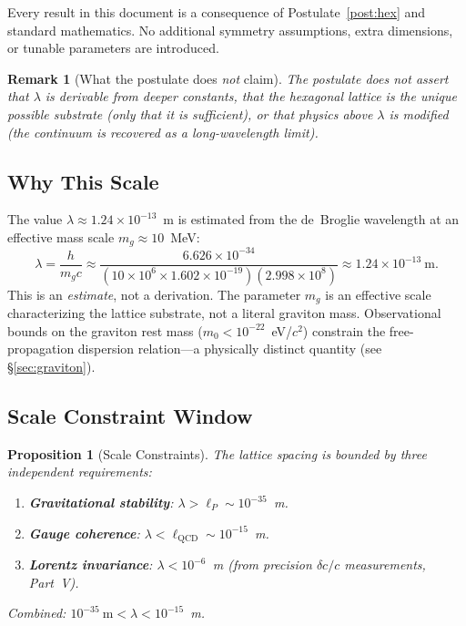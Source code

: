\documentclass[11pt,letterpaper]{article}
\newtheorem{proposition}[theorem]{Proposition}
\newtheorem{remark}[theorem]{Remark}
\begin{document}
Every result in this document is a consequence of Postulate~\ref{post:hex}
and standard mathematics.  No additional symmetry assumptions, extra
dimensions, or tunable parameters are introduced.

\begin{remark}[What the postulate does \emph{not} claim]
The postulate does not assert that $\lambda$ is derivable from deeper
constants, that the hexagonal lattice is the unique possible substrate
(only that it is sufficient), or that physics above $\lambda$ is
modified (the continuum is recovered as a long-wavelength limit).
\end{remark}

\subsection{Why This Scale}

The value $\lambda \approx 1.24 \times 10^{-13}$~m is estimated from the
de~Broglie wavelength at an effective mass scale $m_g \approx 10$~MeV:
\begin{equation}\label{eq:lambda}
  \lambda = \frac{h}{m_g c}
  \approx \frac{6.626\times10^{-34}}
               {(10\times10^6\times1.602\times10^{-19})(2.998\times10^8)}
  \approx 1.24\times10^{-13}~\text{m}.
\end{equation}
This is an \emph{estimate}, not a derivation.  The parameter $m_g$ is
an effective scale characterizing the lattice substrate, not a literal
graviton mass.  Observational bounds on the graviton rest mass
($m_0 < 10^{-22}$~eV/$c^2$) constrain the free-propagation dispersion
relation---a physically distinct quantity (see \S\ref{sec:graviton}).

\subsection{Scale Constraint Window}

\begin{proposition}[Scale Constraints]\label{prop:constraints}
The lattice spacing is bounded by three independent requirements:
\begin{enumerate}[label=(\roman*),nosep]
  \item \textbf{Gravitational stability}: $\lambda > \ell_P \sim 10^{-35}$~m.
  \item \textbf{Gauge coherence}: $\lambda < \ell_\mathrm{QCD} \sim 10^{-15}$~m.
  \item \textbf{Lorentz invariance}: $\lambda < 10^{-6}$~m
        (from precision $\delta c/c$ measurements, Part~V).
\end{enumerate}
Combined: $10^{-35}~\text{m} < \lambda < 10^{-15}$~m.
\end{proposition}
\end{document}
